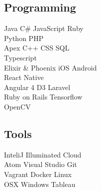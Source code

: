 \documentclass[]{deedy-resume-openfont}
\begin{document}
\begin{minipage}[t]{0.33\textwidth}
\subsection{Programming}
Java \textbullet{}   C\# \textbullet{} JavaScript \textbullet{} Ruby\\
Python \textbullet{} PHP\\
\sectionsep
{}
Apex \textbullet{} C++ \textbullet{} CSS \textbullet{} SQL\\
Typescript\\
\sectionsep
{}
Elixir \& Phoenix \textbullet{} iOS \textbullet{} Android\\
React Native\\
\sectionsep
{}
Angular 4 \textbullet{} D3 \textbullet{} Laravel \\
Ruby on Rails \textbullet{} Tensorflow\\
OpenCV
\sectionsep
\subsection{Tools}
InteliJ \textbullet{} Illuminated Cloud \\
Atom \textbullet{} Visual Studio \textbullet{} Git\\
Vagrant \textbullet{} Docker \textbullet{} Linux\\
OSX \textbullet{} Windows \textbullet{} Tableau
\sectionsep

%
%

\end{minipage} 
\hfill
\end{document}
